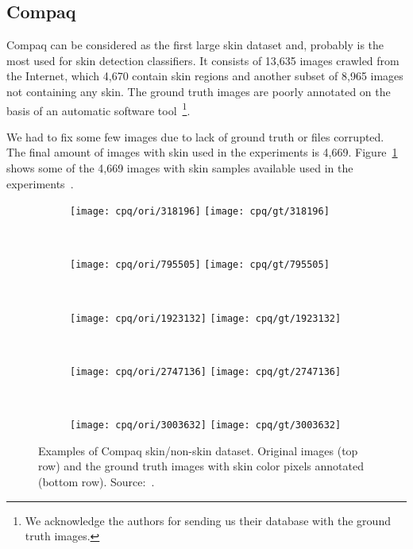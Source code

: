 \subsection{Compaq}
\label{sec:datasets_compaq}
Compaq can be considered as the first large skin dataset and, probably is the most used for skin detection classifiers. It consists of 13,635 images crawled from the Internet, which 4,670 contain skin regions and another subset of 8,965 images not containing any skin. The ground truth images are poorly annotated on the basis of an automatic software tool~\citep{mahmoodi:16}\footnote{We acknowledge the authors for sending us their database with the ground truth images.}.

 We had to fix some few images due to lack of ground truth or files corrupted. The final amount of images with skin used in the experiments is 4,669. Figure~\ref{fig:compaq_dataset_example} shows some of the 4,669 images with skin samples available used in the experiments~\citep{jones:02}.

\begin{figure}[!htb]
    \centering
    \begin{subfigure}[t]{0.269\textwidth}
        \texttt{[image: cpq/ori/318196]}
        \texttt{[image: cpq/gt/318196]}
    \end{subfigure}
    ~
    \begin{subfigure}[t]{0.214\textwidth}
        \texttt{[image: cpq/ori/795505]}
        \texttt{[image: cpq/gt/795505]}
    \end{subfigure}
    ~
    \begin{subfigure}[t]{0.132\textwidth}
        \texttt{[image: cpq/ori/1923132]}
        \texttt{[image: cpq/gt/1923132]}
    \end{subfigure}
    ~
    \begin{subfigure}[t]{0.14\textwidth}
        \texttt{[image: cpq/ori/2747136]}
        \texttt{[image: cpq/gt/2747136]}
    \end{subfigure}
    ~
    \begin{subfigure}[t]{0.12\textwidth}
        \texttt{[image: cpq/ori/3003632]}
        \texttt{[image: cpq/gt/3003632]}
    \end{subfigure}
    \caption[Examples of Compaq skin/non-skin dataset]{Examples of Compaq skin/non-skin dataset. Original images (top row) and the ground truth images with skin color pixels annotated (bottom row). Source:~\citet{jones:02}.}
    \label{fig:compaq_dataset_example}
\end{figure}



